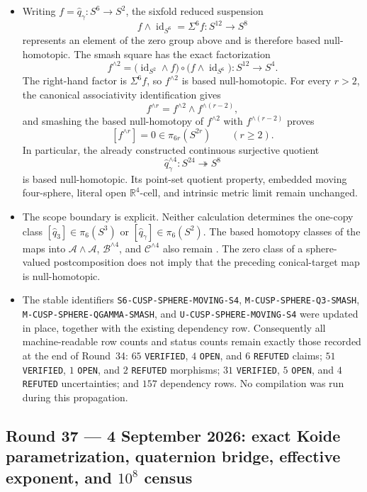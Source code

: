 \begin{itemize}[leftmargin=1.8em]
\item Writing \(f=\widehat q_\gamma:S^6\to S^2\), the sixfold reduced
suspension
\[
 f\wedge\operatorname{id}_{S^6}=\Sigma^6f:S^{12}\longrightarrow S^8
\]
represents an element of the zero group above and is therefore based
null-homotopic.  The smash square has the exact factorization
\[
 f^{\wedge2}
 =\bigl(\operatorname{id}_{S^2}\wedge f\bigr)
  \circ\bigl(f\wedge\operatorname{id}_{S^6}\bigr):
 S^{12}\longrightarrow S^4.
\]
The right-hand factor is \(\Sigma^6f\), so \(f^{\wedge2}\) is based
null-homotopic.  For every \(r>2\), the canonical associativity
identification gives
\[
 f^{\wedge r}=f^{\wedge2}\wedge f^{\wedge(r-2)},
\]
and smashing the based null-homotopy of \(f^{\wedge2}\) with
\(f^{\wedge(r-2)}\) proves
\[
 [f^{\wedge r}]=0\in\pi_{6r}(S^{2r})
 \qquad(r\geq2).
\]
In particular, the already constructed continuous surjective quotient
\[
 \widehat q_\gamma^{\wedge4}:S^{24}\twoheadrightarrow S^8
\]
is based null-homotopic.  Its point-set quotient property, embedded moving
four-sphere, literal open \(\mathbb R^4\)-cell, and intrinsic metric limit
remain unchanged.

\item The scope boundary is explicit.  Neither calculation determines the
one-copy class \([\widehat q_3]\in\pi_6(S^3)\) or
\([\widehat q_\gamma]\in\pi_6(S^2)\).  The based homotopy classes of the maps into
\(\mathcal A\wedge\mathcal A\), \(\mathcal B^{\wedge4}\), and
\(\mathcal C^{\wedge4}\) also remain \Open.  The zero class of a
sphere-valued postcomposition does not imply that the preceding
conical-target map is null-homotopic.

\item The stable identifiers
\texttt{S6-CUSP-SPHERE-MOVING-S4},
\texttt{M-CUSP-SPHERE-Q3-SMASH},
\texttt{M-CUSP-SPHERE-QGAMMA-SMASH}, and
\texttt{U-CUSP-SPHERE-MOVING-S4} were updated in place, together with the
existing dependency row.  Consequently all machine-readable row counts and
status counts remain exactly those recorded at the end of Round~34: \(65\)
\texttt{VERIFIED}, \(4\) \texttt{OPEN}, and \(6\) \texttt{REFUTED}
claims; \(51\) \texttt{VERIFIED}, \(1\) \texttt{OPEN}, and \(2\)
\texttt{REFUTED} morphisms; \(31\) \texttt{VERIFIED}, \(5\)
\texttt{OPEN}, and \(4\) \texttt{REFUTED} uncertainties; and \(157\)
dependency rows.  No compilation was run during this propagation.
\end{itemize}

\subsection*{Round 37 --- 4 September 2026: exact Koide parametrization,
quaternion bridge, effective exponent, and \(10^8\) census}

